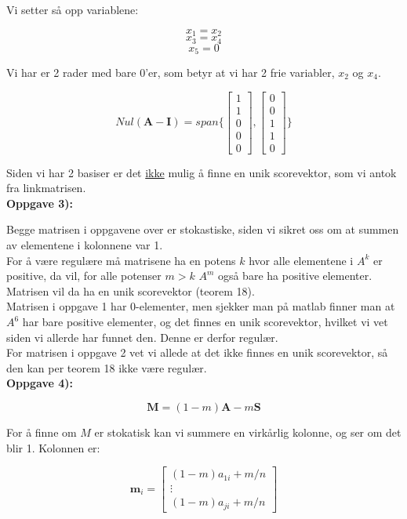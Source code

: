 \documentclass[a4paper,norsk,11pt,twoside]{article}
\begin{document}
Vi setter så opp variablene:

$$
x_1 = x_2
$$
$$
x_3 = x_4
$$
$$
x_5 = 0
$$

Vi har er 2 rader med bare 0'er, som betyr at vi har 2 frie variabler, $x_2$ og $x_4$.

$$
Nul(\textbf{A} -\textbf{I}) = span\{ \begin{bmatrix}
1 \\ 1 \\ 0 \\ 0 \\ 0
\end{bmatrix},
\begin{bmatrix}
0 \\ 0 \\ 1 \\ 1 \\ 0
\end{bmatrix} \}
$$

Siden vi har 2 basiser er det \underline{ikke} mulig å finne en unik scorevektor, som vi antok fra linkmatrisen.\\

\textbf{Oppgave 3):}

Begge matrisen i oppgavene over er stokastiske, siden vi sikret oss om at summen av elementene i kolonnene var 1.\\

For å være regulære må matrisene ha en potens $k$ hvor alle elementene i $A^{k}$ er positive, da vil, for alle potenser $m>k$ $A^{m}$ også bare ha positive elementer. Matrisen vil da ha en unik scorevektor (teorem 18).\\

Matrisen i oppgave 1 har 0-elementer, men sjekker man på matlab finner man at $A^{6}$ har bare positive elementer, og det finnes en unik scorevektor, hvilket vi vet siden vi allerde har funnet den. Denne er derfor regulær.\\

For matrisen i oppgave 2 vet vi allede at det ikke finnes en unik scorevektor, så den kan per teorem 18 ikke være regulær.\\

\textbf{Oppgave 4):}

$$
\textbf{M} = (1-m)\textbf{A} - m\textbf{S}
$$

For å finne om $M$ er stokatisk kan vi summere en virkårlig kolonne, og ser om det blir 1. Kolonnen er:

$$
\textbf{m}_i =
\begin{bmatrix}
(1-m)a_{1i} + m/n\\ \vdots \\ (1-m)a_{ji} + m/n
\end{bmatrix}
$$
\end{document}
